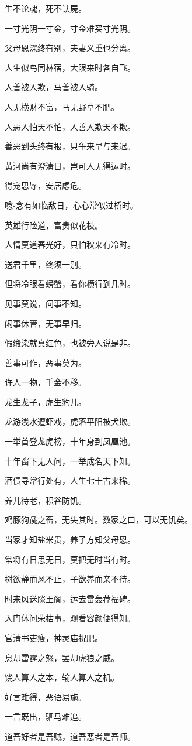 \documentclass[12pt,oneside]{book}
\begin{document}
生不论魂，死不认屍。

一寸光阴一寸金，寸金难买寸光阴。

父母恩深终有别，夫妻义重也分离。

人生似鸟同林宿，大限来时各自飞。

人善被人欺，马善被人骑。

人无横财不富，马无野草不肥。

人恶人怕天不怕，人善人欺天不欺。

善恶到头终有报，只争来早与来迟。

黄河尚有澄淸日，岂可人无得运时。

得宠思辱，安居虑危。

唸-{念}有如临敌日，心心常似过桥时。

英雄行险道，富贵似花枝。

人情莫道春光好，只怕秋来有冷时。

送君千里，终须一别。

但将冷眼看螃蟹，看你横行到几时。

见事莫说，问事不知。

闲事休管，无事早归。

假缎染就真红色，也被旁人说是非。

善事可作，恶事莫为。

许人一物，千金不移。

龙生龙子，虎生豹儿。

龙游浅水遭虾戏，虎落平阳被犬欺。

一举首登龙虎榜，十年身到凤凰池。

十年窗下无人问，一举成名天下知。

酒债寻常行处有，人生七十古来稀。

养儿待老，积谷防饥。

鸡豚狗彘之畜，无失其时。数家之口，可以无饥矣。

当家才知盐米贵，养子方知父母恩。

常将有日思无日，莫把无时当有时。

树欲静而风不止，子欲养而亲不待。

时来风送滕王阁，运去雷轰荐福碑。

入门休问荣枯事，观看容颜便得知。

官淸书吏瘦，神灵庙祝肥。

息却雷霆之怒，罢却虎狼之威。

饶人算人之本，输人算人之机。

好言难得，恶语易施。

一言既出，驷马难追。

道吾好者是吾贼，道吾恶者是吾师。
\end{document}
